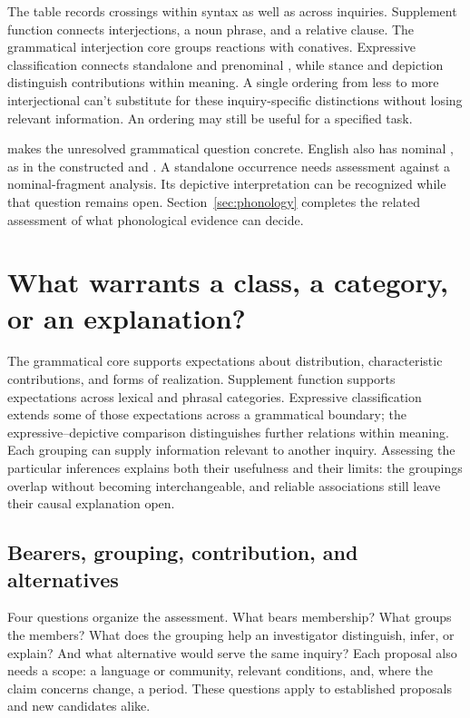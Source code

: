\documentclass[12pt]{article}
\begin{document}
The table records crossings within syntax as well as across inquiries.
Supplement function connects interjections, a noun phrase, and a relative
clause. The grammatical interjection core groups reactions with conatives.
Expressive classification connects standalone and prenominal ,
while stance and depiction distinguish contributions within meaning.
A single ordering from less to more interjectional can't
substitute for these inquiry-specific distinctions without losing relevant
information. An ordering may still be useful for a specified task.

 makes the unresolved grammatical question concrete.
English also has nominal , as in the constructed
 and . A standalone occurrence
needs assessment against a nominal-fragment analysis.
Its depictive interpretation can be recognized while that question remains
open. Section~\ref{sec:phonology} completes the related assessment of
what phonological evidence can decide.

\section{What warrants a class, a category, or an explanation?}\label{sec:assessment}

The grammatical core supports expectations about distribution, characteristic
contributions, and forms of realization. Supplement function supports
expectations across lexical and phrasal categories. Expressive classification extends
some of those expectations across a grammatical boundary; the expressive--depictive
comparison distinguishes further relations within meaning. Each grouping
can supply information relevant to another inquiry. Assessing the particular
inferences explains both their usefulness and their limits: the groupings
overlap without becoming interchangeable, and reliable associations still
leave their causal explanation open.

\subsection{Bearers, grouping, contribution, and alternatives}

Four questions organize the assessment. What bears membership? What groups
the members? What does the grouping help an investigator distinguish,
infer, or explain? And what alternative would serve the same inquiry?
Each proposal also needs a scope: a language or community, relevant
conditions, and, where the claim concerns change, a period. These
questions apply to established proposals and new candidates alike.
\end{document}
